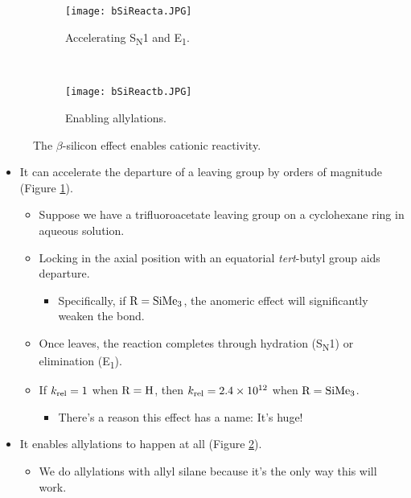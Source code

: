 \documentclass[../notes.tex]{subfiles}
\begin{document}
\begin{itemize}
\begin{figure}[h!]
\begin{subfigure}[b]{\linewidth}
            \texttt{[image: bSiReacta.JPG]}
            \caption{Accelerating S\textsubscript{N}1 and E\textsubscript{1}.}
            \label{fig:bSiReacta}
        \end{subfigure}\\[2em]
        \begin{subfigure}[b]{\linewidth}
            \centering
            \texttt{[image: bSiReactb.JPG]}
            \caption{Enabling allylations.}
            \label{fig:bSiReactb}
        \end{subfigure}
        \caption{The $\beta$-silicon effect enables cationic reactivity.}
        \label{fig:bSiReact}
    \end{figure}
    \begin{itemize}
        \item It can accelerate the departure of a leaving group by orders of magnitude (Figure \ref{fig:bSiReacta}).
        \begin{itemize}
            \item Suppose we have a trifluoroacetate leaving group on a cyclohexane ring in aqueous solution.
            \item Locking  in the axial position with an equatorial \emph{tert}-butyl group aids departure.
            \begin{itemize}
                \item Specifically, if $\ce{R}=\ce{SiMe3}$, the anomeric effect will significantly weaken the  bond.
            \end{itemize}
            \item Once  leaves, the reaction completes through hydration (S\textsubscript{N}1) or elimination (E\textsubscript{1}).
            \item If $k_\textup{rel}=1$ when $\ce{R}=\ce{H}$, then $k_\textup{rel}=\num{2.4e12}$ when $\ce{R}=\ce{SiMe3}$.
            \begin{itemize}
                \item There's a reason this effect has a name: It's huge!
            \end{itemize}
        \end{itemize}
        \item It enables allylations to happen at all (Figure \ref{fig:bSiReactb}).
        \begin{itemize}
            \item We do allylations with allyl silane because it's the only way this will work.

\end{itemize}
\end{itemize}
\end{itemize}
\end{document}
